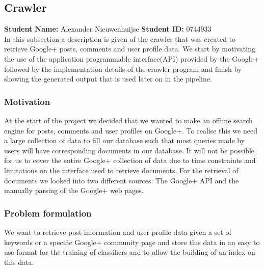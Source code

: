 \subsection{Crawler}
\textbf{Student Name: }Alexander Nieuwenhuijse \textbf{Student ID:} 0744933\\
In this subsection a description is given of the crawler that was created to retrieve Google+ posts, comments and user profile data. We start by motivating the use of the application programmable interface(API) provided by the Google+ followed by the implementation details of the crawler program and finish by showing the generated output that is used later on in the pipeline.
\subsubsection*{Motivation}
At the start of the project we decided that we wanted to make an offline search engine for posts, comments and user profiles on Google+. To realise this we need a large collection of data to fill our database such that most queries made by users will have corresponding documents in our database. It will not be possible for us to cover the entire Google+ collection of data due to time constraints and limitations on the interface used to retrieve documents. For the retrieval of documents we looked into two different sources: The Google+ API and the manually parsing of the Google+ web pages.
\subsubsection*{Problem formulation}
We want to retrieve post information and user profile data given a set of keywords or a specific Google+ community page and store this data in an easy to use format for the training of classifiers and to allow the building of an index on this data.
